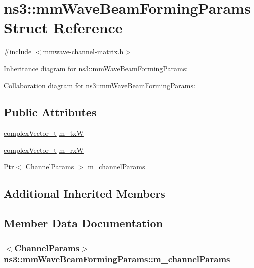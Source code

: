\hypertarget{structns3_1_1mmWaveBeamFormingParams}{}\section{ns3\+:\+:mm\+Wave\+Beam\+Forming\+Params Struct Reference}
\label{structns3_1_1mmWaveBeamFormingParams}


{\ttfamily \#include $<$mmwave-\/channel-\/matrix.\+h$>$}



Inheritance diagram for ns3\+:\+:mm\+Wave\+Beam\+Forming\+Params\+:


Collaboration diagram for ns3\+:\+:mm\+Wave\+Beam\+Forming\+Params\+:
\subsection*{Public Attributes}
\begin{DoxyCompactItemize}
\item 
\hyperlink{namespacens3_a6a7f75817ae50e6ac47414955b17d926}{complex\+Vector\+\_\+t} \hyperlink{structns3_1_1mmWaveBeamFormingParams_ac1886cb4a6495aaee7df49b78c79c603}{m\+\_\+txW}
\item 
\hyperlink{namespacens3_a6a7f75817ae50e6ac47414955b17d926}{complex\+Vector\+\_\+t} \hyperlink{structns3_1_1mmWaveBeamFormingParams_adeec98608a7bf0b20e6718fa6d5f3e48}{m\+\_\+rxW}
\item 
\hyperlink{classns3_1_1Ptr}{Ptr}$<$ \hyperlink{structns3_1_1ChannelParams}{Channel\+Params} $>$ \hyperlink{structns3_1_1mmWaveBeamFormingParams_ad07d39d2629a7608bb3c60a297e4c722}{m\+\_\+channel\+Params}
\end{DoxyCompactItemize}
\subsection*{Additional Inherited Members}


\subsection{Member Data Documentation}
\subsubsection[{\texorpdfstring{m\+\_\+channel\+Params}{m_channelParams}}]{$<${\bf Channel\+Params}$>$ ns3\+::mm\+Wave\+Beam\+Forming\+Params\+::m\+\_\+channel\+Params}\hypertarget{structns3_1_1mmWaveBeamFormingParams_ad07d39d2629a7608bb3c60a297e4c722}{}\label{structns3_1_1mmWaveBeamFormingParams_ad07d39d2629a7608bb3c60a297e4c722}
